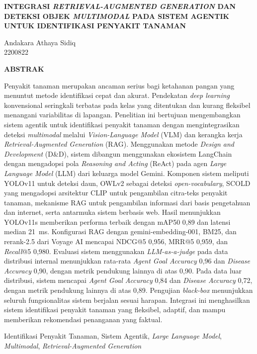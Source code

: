 \documentclass[12pt, a4paper, oneside]{report}
\newcommand{\wordonespacing}{0.955212}
\newcommand{\wordonehalfspacing}{1.432818}
\newenvironment{abstract-id}{
    \clearpage
    \setstretch{\wordonespacing}
    \fontsize{11pt}{13pt}\selectfont
}{
    \par
}
\newcommand{\thesistitle}{INTEGRASI \textit{RETRIEVAL-AUGMENTED GENERATION} DAN DETEKSI OBJEK \textit{MULTIMODAL} PADA SISTEM AGENTIK UNTUK IDENTIFIKASI PENYAKIT TANAMAN}
\newcommand{\authorname}{Andakara Athaya Sidiq}
\newcommand{\studentid}{2200822}
\begin{document}
\begin{abstract-id}
    \begin{center}
        {\bfseries \setstretch{\wordonehalfspacing} \MakeUppercase{\thesistitle} \par}
        \vspace{\baselineskip}
        {\setstretch{\wordonehalfspacing} \authorname \\
        \studentid \par}
        \vspace{\baselineskip}
        {\bfseries ABSTRAK}
    \end{center}
    \vspace{-0.5em}
    Penyakit tanaman merupakan ancaman serius bagi ketahanan pangan yang menuntut metode identifikasi cepat dan akurat. Pendekatan \textit{deep learning} konvensional seringkali terbatas pada kelas yang ditentukan dan kurang fleksibel menangani variabilitas di lapangan. Penelitian ini bertujuan mengembangkan sistem agentik untuk identifikasi penyakit tanaman dengan mengintegrasikan deteksi \textit{multimodal} melalui \textit{Vision-Language Model} (VLM) dan kerangka kerja \textit{Retrieval-Augmented Generation} (RAG). Menggunakan metode \textit{Design and Development} (D\&D), sistem dibangun menggunakan ekosistem LangChain dengan mengadopsi pola \textit{Reasoning and Acting} (ReAct) pada agen \textit{Large Language Model} (LLM) dari keluarga model Gemini. Komponen sistem meliputi YOLOv11 untuk deteksi daun, OWLv2 sebagai deteksi \textit{open-vocabulary}, SCOLD yang mengadopsi arsitektur CLIP untuk pengambilan citra-teks penyakit tanaman, mekanisme RAG untuk pengambilan informasi dari basis pengetahuan dan internet, serta antarmuka sistem berbasis web. Hasil menunjukkan YOLOv11s memberikan performa terbaik dengan mAP50 0,89 dan latensi median \qty{21}{ms}. Konfigurasi RAG dengan gemini-embedding-001, BM25, dan rerank-2.5 dari Voyage AI mencapai NDCG@5 0,956, MRR@5 0,959, dan \textit{Recall}@5 0,980. Evaluasi sistem menggunakan \textit{LLM-as-a-judge} pada data distribusi internal menunjukkan rata-rata \textit{Agent Goal Accuracy} 0,96 dan \textit{Disease Accuracy} 0,90, dengan metrik pendukung lainnya di atas 0,90. Pada data luar distribusi, sistem mencapai \textit{Agent Goal Accuracy} 0,84 dan \textit{Disease Accuracy} 0,72, dengan metrik pendukung lainnya di atas 0,89. Pengujian \textit{black-box} menunjukkan seluruh fungsionalitas sistem berjalan sesuai harapan. Integrasi ini menghasilkan sistem identifikasi penyakit tanaman yang fleksibel, adaptif, dan mampu memberikan rekomendasi penanganan yang faktual.
    
    \vspace{1em}
     Identifikasi Penyakit Tanaman, Sistem Agentik, \textit{Large Language Model}, \textit{Multimodal}, \textit{Retrieval-Augmented Generation}
\end{abstract-id}
\end{document}
